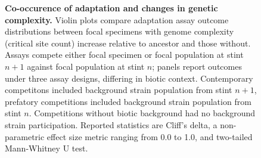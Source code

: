 \begin{figure}
\caption{
    \textbf{Co-occurence of adaptation and changes in genetic complexity.}
    \footnotesize
    Violin plots compare adaptation assay outcome distributions between focal specimens with genome complexity (critical site count) increase relative to ancestor and those without.
    Assays compete either focal specimen or focal population at stint $n+1$ against focal population at stint $n$;
    panels report outcomes under three assay designs, differing in biotic context.
    Contemporary competitons included background strain population from stint $n+1$, prefatory competitions included background strain population from stint $n$.
    Competitions without biotic background had no background strain participation.
    Reported statistics are Cliff's delta, a non-parametric effect size metric ranging from 0.0 to 1.0, and two-tailed Mann-Whitney U test.
}
\label{fig:fitness-gcomplexity}

\end{figure}
